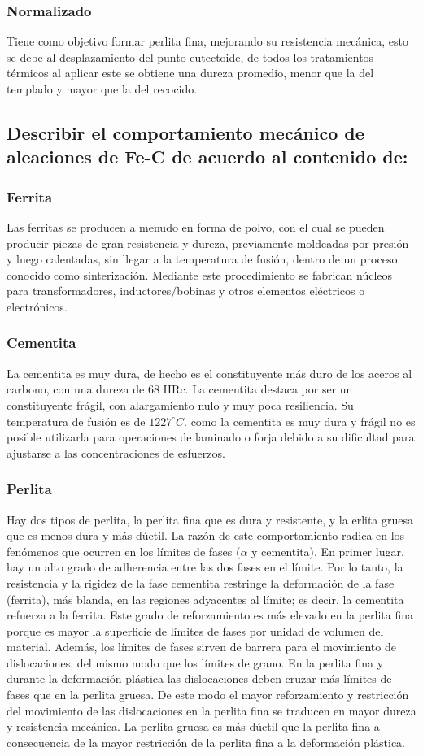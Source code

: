 \documentclass[a4paper, 9pt]{article}
\begin{document}
\subsubsection{Normalizado}
Tiene como objetivo formar perlita fina, mejorando su resistencia mecánica, esto se debe al desplazamiento del punto eutectoide, de todos los tratamientos térmicos al aplicar este se obtiene una dureza promedio, menor que la del templado y mayor que la del recocido.
\subsection{Describir el comportamiento mecánico de aleaciones de Fe-C de acuerdo al contenido de:}
\subsubsection{Ferrita}
Las ferritas se producen a menudo en forma de polvo, con el cual se pueden producir piezas de gran resistencia y dureza, previamente moldeadas por presión y luego calentadas, sin llegar a la temperatura de fusión, dentro de un proceso conocido como sinterización. Mediante este procedimiento se fabrican núcleos para transformadores, inductores$/$bobinas y otros elementos eléctricos o electrónicos.
\subsubsection{Cementita}
La cementita es muy dura, de hecho es el constituyente más duro de los aceros al carbono, con una dureza de 68 HRc. La cementita destaca por ser un constituyente frágil, con alargamiento nulo y muy poca resiliencia. Su temperatura de fusión es de $1227^{\circ}C$. como la cementita es muy dura y frágil no es posible utilizarla para operaciones de laminado o forja debido a su dificultad para ajustarse a las concentraciones de esfuerzos.
\subsubsection{Perlita}
Hay dos tipos de perlita, la perlita fina que es dura y resistente, y la erlita gruesa que es menos dura y más dúctil.
La razón de este comportamiento radica en los fenómenos que ocurren en los límites de fases ($\alpha$ y cementita). En primer lugar, hay un alto grado de adherencia entre las dos fases en el límite. Por lo tanto, la resistencia y la rigidez de la fase cementita restringe la deformación de la fase (ferrita), más blanda, en las regiones adyacentes al límite; es decir, la cementita refuerza a la ferrita. Este grado de reforzamiento es más elevado en la perlita fina porque es mayor la superficie de límites de fases por unidad de volumen del material. Además, los límites de fases sirven de barrera para el movimiento de dislocaciones, del mismo modo que los límites de grano. En la perlita fina y durante la deformación plástica las dislocaciones deben cruzar más límites de fases que en la perlita gruesa. De este modo el mayor reforzamiento y restricción del movimiento de las dislocaciones en la perlita fina se traducen en mayor dureza y resistencia mecánica. La perlita gruesa es más dúctil que la perlita fina a consecuencia de la mayor restricción de la perlita fina a la deformación plástica.
\end{document}
